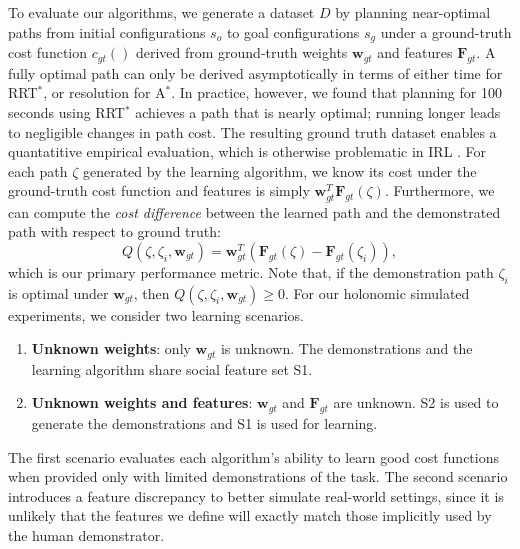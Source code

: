 \documentclass[a4paper,11pt]{report}
\begin{document}
	To evaluate our algorithms, we generate a dataset $D$ by planning near-optimal paths from initial configurations $s_o$ to goal configurations $s_g$ under a ground-truth cost function $c_{gt}()$ derived from ground-truth weights $\mathbf{w}_{gt}$ and features $\mathbf{F}_{gt}$. A fully optimal path can only be derived asymptotically in terms of either time  for RRT$^*$, or resolution for A$^*$. In practice, however, we found that planning for 100 seconds using  RRT$^*$  achieves a path that is nearly optimal; running longer leads to negligible changes in path cost. 
	The resulting ground truth dataset enables a quantatitive empirical evaluation, which is otherwise problematic in IRL \cite{vasquez2014inverse,shiarlis2016inverse}. For each path $\zeta$ generated by the learning algorithm, we know its cost under the ground-truth cost function and features is simply  $\mathbf{w}_{gt}^T\mathbf{F}_{gt}(\zeta)$. Furthermore, we can compute the \emph{cost difference} between the learned path and the demonstrated path with respect to ground truth:
	\begin{equation}
		Q(\zeta,\zeta_i,\mathbf{w}_{gt}) = \mathbf{w}_{gt}^T(\mathbf{F}_{gt}(\zeta)-\mathbf{F}_{gt}(\zeta_i)), \label{eq:obj_eval}
	\end{equation}
which is our primary performance metric.  Note that, if the demonstration path $\zeta_i$ is optimal under $\mathbf{w}_{gt}$, then $Q(\zeta,\zeta_i,\mathbf{w}_{gt}) \geq 0$. For our holonomic simulated experiments, we consider two learning scenarios.
\begin{enumerate}
	\item \textbf{Unknown weights}: only $\mathbf{w}_{gt}$ is unknown. The demonstrations and the learning algorithm share social feature set S1.
	\item \textbf{Unknown weights and features}: $\mathbf{w}_{gt}$ and $\mathbf{F}_{gt}$  are unknown. S2 is used to generate the demonstrations and S1 is used for learning.
\end{enumerate}

The first scenario evaluates each algorithm's ability to learn good cost functions when provided only with limited demonstrations of the task. The second scenario introduces a feature discrepancy to better simulate real-world settings, since it is unlikely that the features we define will exactly match those implicitly used by the human demonstrator.
\end{document}
